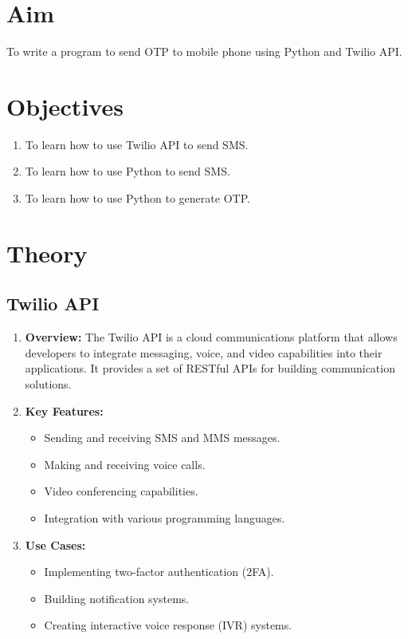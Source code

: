 \documentclass[11pt]{article}
\begin{document}
\tableofcontents
\thispagestyle{empty}
\clearpage

\setcounter{page}{1}

\section{Aim}
To write a program to send OTP to mobile phone using Python and Twilio API.
\section{Objectives}
\begin{enumerate}
    \item To learn how to use Twilio API to send SMS.
    \item To learn how to use Python to send SMS.
    \item To learn how to use Python to generate OTP.
\end{enumerate}
\section{Theory}

\subsection{Twilio API}
\begin{enumerate}
    \item \textbf{Overview:} The Twilio API is a cloud communications platform that allows developers to integrate messaging, voice, and video capabilities into their applications. It provides a set of RESTful APIs for building communication solutions.

    \item \textbf{Key Features:}
          \begin{itemize}
              \item Sending and receiving SMS and MMS messages.
              \item Making and receiving voice calls.
              \item Video conferencing capabilities.
              \item Integration with various programming languages.
          \end{itemize}

    \item \textbf{Use Cases:}
          \begin{itemize}
              \item Implementing two-factor authentication (2FA).
              \item Building notification systems.
              \item Creating interactive voice response (IVR) systems.
          \end{itemize}

\end{enumerate}
\end{document}
